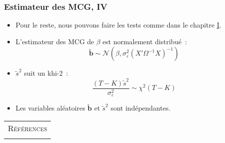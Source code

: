 \documentclass[10pt]{beamer}
\theoremstyle{plain}
\begin{document}
\begin{frame}
  \frametitle{Estimateur des MCG, IV}

  \begin{itemize}

  \item Pour le reste, nous pouvons faire les tests comme dans le chapitre \href{https://le-mans.adjemian.eu/econometrics/chapitre-1.pdf}{I}.\newline

  \item L'estimateur des MCG de $\beta$ est normalement distribué~:
    \[
      \tilde{\mathbf b} \sim \mathcal N\left(\beta, \sigma_{\varepsilon}^2\left(X'\Omega^{-1} X \right)^{-1} \right)
    \]
    \medskip

  \item $\tilde{s}^2$ suit un khi-2~:
    \[
      \frac{(T-K)\tilde{s}^2}{\sigma_{\varepsilon}^2} \sim \chi^2(T-K)
    \]
    \medskip

  \item Les variables aléatoires $\tilde{\mathbf b}$ et $\tilde{s}^2$ sont indépendantes.
  \end{itemize}


\end{frame}





\begin{notes}

  \begin{center}
    \begin{tabular}{c}
      \\
      \Huge{\textsc{Références}}\\
      \\
    \end{tabular}
  \end{center}

  \bigskip

  \nocite{Green2017}

  \nocite{Schmidt1976}

  \printbibliography

\end{notes}
\end{document}
